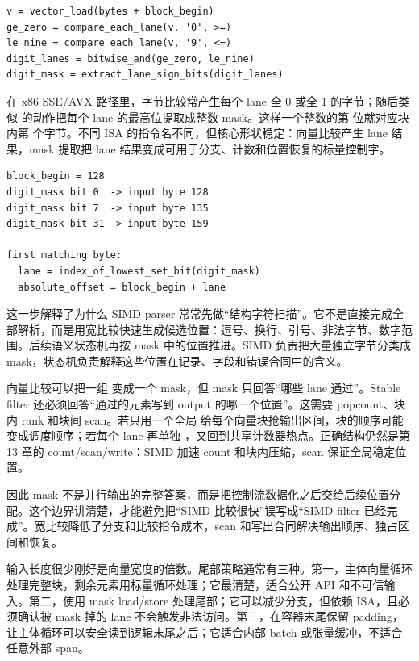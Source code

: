 \begin{lstlisting}[numbers=none,caption={向量数字分类的机器动作抽象}]
v = vector_load(bytes + block_begin)
ge_zero = compare_each_lane(v, '0', >=)
le_nine = compare_each_lane(v, '9', <=)
digit_lanes = bitwise_and(ge_zero, le_nine)
digit_mask = extract_lane_sign_bits(digit_lanes)
\end{lstlisting}

在 x86 SSE/AVX 路径里，字节比较常产生每个 lane 全 0 或全 1 的字节；随后类似  的动作把每个 lane 的最高位提取成整数 mask。这样一个整数的第  位就对应块内第  个字节。不同 ISA 的指令名不同，但核心形状稳定：向量比较产生 lane 结果，mask 提取把 lane 结果变成可用于分支、计数和位置恢复的标量控制字。

\begin{lstlisting}[numbers=none,caption={mask 到位置的映射合同}]
block_begin = 128
digit_mask bit 0  -> input byte 128
digit_mask bit 7  -> input byte 135
digit_mask bit 31 -> input byte 159

first matching byte:
  lane = index_of_lowest_set_bit(digit_mask)
  absolute_offset = block_begin + lane
\end{lstlisting}

这一步解释了为什么 SIMD parser 常常先做“结构字符扫描”。它不是直接完成全部解析，而是用宽比较快速生成候选位置：逗号、换行、引号、非法字节、数字范围。后续语义状态机再按 mask 中的位置推进。SIMD 负责把大量独立字节分类成 mask，状态机负责解释这些位置在记录、字段和错误合同中的含义。

向量比较可以把一组  变成一个 mask，但 mask 只回答“哪些 lane 通过”。Stable filter 还必须回答“通过的元素写到 output 的哪一个位置”。这需要 popcount、块内 rank 和块间 scan。若只用一个全局  给每个向量块抢输出区间，块的顺序可能变成调度顺序；若每个 lane 再单独 ，又回到共享计数器热点。正确结构仍然是第 13 章的 count/scan/write：SIMD 加速 count 和块内压缩，scan 保证全局稳定位置。

因此 mask 不是并行输出的完整答案，而是把控制流数据化之后交给后续位置分配。这个边界讲清楚，才能避免把“SIMD 比较很快”误写成“SIMD filter 已经完成”。宽比较降低了分支和比较指令成本，scan 和写出合同解决输出顺序、独占区间和恢复。

输入长度很少刚好是向量宽度的倍数。尾部策略通常有三种。第一，主体向量循环处理完整块，剩余元素用标量循环处理；它最清楚，适合公开 API 和不可信输入。第二，使用 mask load/store 处理尾部；它可以减少分支，但依赖 ISA，且必须确认被 mask 掉的 lane 不会触发非法访问。第三，在容器末尾保留 padding，让主体循环可以安全读到逻辑末尾之后；它适合内部 batch 或张量缓冲，不适合任意外部 span。

